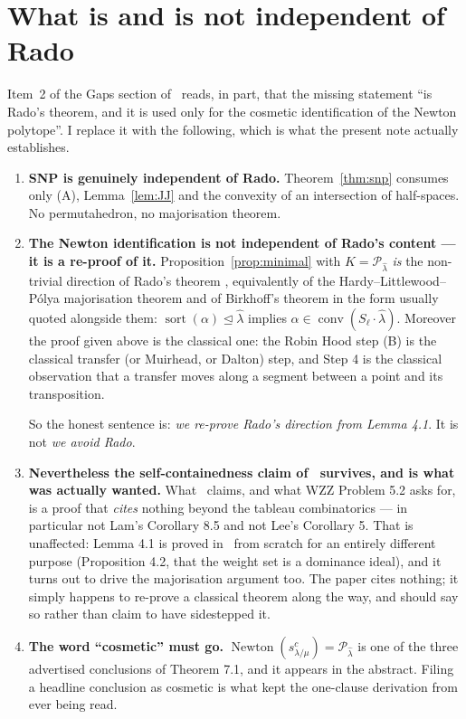 \documentclass[11pt]{article}
\theoremstyle{plain}
\theoremstyle{definition}
\DeclareMathOperator{\Newton}{Newton}
\DeclareMathOperator{\conv}{conv}
\DeclareMathOperator{\srt}{sort}
\newcommand{\lhat}{\hat\lambda}
\newcommand{\Perm}{\mathcal{P}}
\begin{document}
\section{What is and is not independent of Rado}\label{sec:honest}

Item~2 of the Gaps section of~\cite{note1} reads, in part, that the missing
statement ``is Rado's theorem, and it is used only for the cosmetic
identification of the Newton polytope''. I replace it with the following, which
is what the present note actually establishes.

\begin{enumerate}
\item \textbf{SNP is genuinely independent of Rado.} Theorem~\ref{thm:snp}
consumes only (A), Lemma~\ref{lem:JJ} and the convexity of an intersection of
half-spaces. No permutahedron, no majorisation theorem.

\item \textbf{The Newton identification is not independent of Rado's content ---
it is a re-proof of it.} Proposition~\ref{prop:minimal} with
$K=\Perm_{\lhat}$ \emph{is} the non-trivial direction of Rado's theorem
\cite{Rado}, equivalently of the Hardy--Littlewood--P\'olya majorisation theorem
\cite[Thm.~46]{HLP} and of Birkhoff's theorem in the form usually quoted
alongside them: $\srt(\alpha)\trianglelefteq\lhat$ implies
$\alpha\in\conv(S_\ell\cdot\lhat)$. Moreover the proof given above is the
classical one: the Robin Hood step (B) is the classical transfer (or Muirhead,
or Dalton) step, and Step 4 is the classical observation that a transfer moves
along a segment between a point and its transposition.

So the honest sentence is: \emph{we re-prove Rado's direction from Lemma 4.1}.
It is not \emph{we avoid Rado}.

\item \textbf{Nevertheless the self-containedness claim of~\cite{note1}
survives, and is what was actually wanted.} What~\cite{note1} claims, and what
WZZ Problem 5.2 \cite{WZZ} asks for, is a proof that \emph{cites} nothing beyond
the tableau combinatorics --- in particular not Lam's Corollary 8.5 and not Lee's
Corollary 5. That is unaffected: Lemma 4.1 is proved in~\cite{note1} from
scratch for an entirely different purpose (Proposition 4.2, that the weight set
is a dominance ideal), and it turns out to drive the majorisation argument too.
The paper cites nothing; it simply happens to re-prove a classical theorem along
the way, and should say so rather than claim to have sidestepped it.

\item \textbf{The word ``cosmetic'' must go.}
$\Newton(s^{c}_{\lambda/\mu})=\Perm_{\lhat}$ is one of the three advertised
conclusions of Theorem 7.1, and it appears in the abstract. Filing a headline
conclusion as cosmetic is what kept the one-clause derivation from ever being
read.
\end{enumerate}
\end{document}
